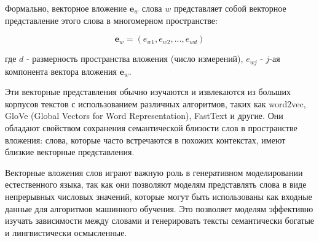 Формально, векторное вложение \( \mathbf{e}_w \) слова \( w \) представляет собой векторное представление этого слова в многомерном пространстве:

\[ \mathbf{e}_w = (e_{w1}, e_{w2}, ..., e_{wd}) \]

где \( d \) - размерность пространства вложения (число измерений), \( e_{wj} \) - \( j \)-ая компонента вектора вложения \( \mathbf{e}_w \).

Эти векторные представления обычно изучаются и извлекаются из больших корпусов текстов с использованием различных алгоритмов, таких как word2vec, GloVe (Global Vectors for Word Representation), FastText и другие. Они обладают свойством сохранения семантической близости слов в пространстве вложения: слова, которые часто встречаются в похожих контекстах, имеют близкие векторные представления.

Векторные вложения слов играют важную роль в генеративном моделировании естественного языка, так как они позволяют моделям представлять слова в виде непрерывных числовых значений, которые могут быть использованы как входные данные для алгоритмов машинного обучения. Это позволяет моделям эффективно изучать зависимости между словами и генерировать тексты семантически богатые и лингвистически осмысленные.




